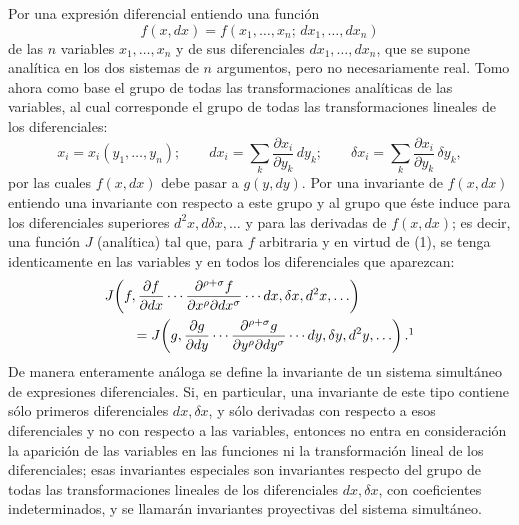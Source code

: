 \documentclass[11pt]{article}
\begin{document}
Por una expresión diferencial entiendo una función
\[
f(x,dx)=f(x_1,\ldots,x_n;\,dx_1,\ldots,dx_n)
\]
de las \(n\) variables \(x_1,\ldots,x_n\) y de sus diferenciales
\(dx_1,\ldots,dx_n\), que se supone analítica en los dos sistemas de
\(n\) argumentos, pero no necesariamente real. Tomo ahora como base el grupo
de todas las transformaciones analíticas de las variables, al cual corresponde
el grupo de todas las transformaciones lineales de los diferenciales:
\begin{equation}
x_i=x_i(y_1,\ldots,y_n);\qquad
dx_i=\sum_k\frac{\partial x_i}{\partial y_k}\,dy_k;\qquad
\delta x_i=\sum_k\frac{\partial x_i}{\partial y_k}\,\delta y_k,
\tag{1}
\end{equation}
por las cuales \(f(x,dx)\) debe pasar a \(g(y,dy)\). Por una invariante de
\(f(x,dx)\) entiendo una invariante con respecto a este grupo y al grupo que
éste induce para los diferenciales superiores \(d^2x,d\delta x,\ldots\) y para
las derivadas de \(f(x,dx)\); es decir, una función \(J\) (analítica) tal que,
para \(f\) arbitraria y en virtud de (1), se tenga identicamente en las
variables y en todos los diferenciales que aparezcan:
\[
\begin{aligned}
&J\!\left(f,\frac{\partial f}{\partial dx}\cdots
\frac{\partial^{\rho+\sigma}f}{\partial x^\rho\partial dx^\sigma}
\cdots dx,\delta x,d^2x,\ldots\right)\\
&\qquad =
J\!\left(g,\frac{\partial g}{\partial dy}\cdots
\frac{\partial^{\rho+\sigma}g}{\partial y^\rho\partial dy^\sigma}
\cdots dy,\delta y,d^2y,\ldots\right).\footnotemark
\end{aligned}
\]
De manera enteramente análoga se define la invariante de un sistema simultáneo
de expresiones diferenciales. Si, en particular, una invariante de este tipo
contiene sólo primeros diferenciales \(dx,\delta x\), y sólo derivadas con
respecto a esos diferenciales y no con respecto a las variables, entonces no
entra en consideración la aparición de las variables en las funciones ni la
transformación lineal de los diferenciales; esas invariantes especiales son
invariantes respecto del grupo de todas las transformaciones lineales de los
diferenciales \(dx,\delta x\), con coeficientes indeterminados, y se llamarán
invariantes proyectivas del sistema simultáneo.
\end{document}
